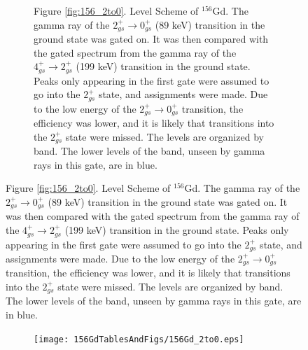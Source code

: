 \begin{figure}[!]
    \centering
    \label{fig:156_2to0}
    \begin{subfigure}{\textwidth}
    \caption*{\centering \fontsize{10pt}{12pt}Figure \ref{fig:156_2to0}. Level Scheme of $^{156}$Gd. The gamma ray of the $2^+_{gs}\rightarrow 0^+_{gs}$ (89 keV) transition in the ground state was gated on. It was then compared with the gated spectrum from the gamma ray of the $4^+_{gs}\rightarrow 2^+_{gs}$ (199 keV) transition in the ground state. Peaks only appearing in the first gate were assumed to go into the $2^+_{gs}$ state, and assignments were made. Due to the low energy of the $2^+_{gs}\rightarrow 0^+_{gs}$ transition, the efficiency was lower, and it is likely that transitions into the $2^+_{gs}$ state were missed. The levels are organized by band. The lower levels of the band, unseen by gamma rays in this gate, are in blue.}
    \end{subfigure}
\end{figure}
\clearpage
\begin{figure}
    \ContinuedFloat
    \begin{subfigure}{\textwidth}
    \texttt{[image: 156GdTablesAndFigs/156Gd\_2to0.eps]}
    \label{fig:156_2to0level}
    \end{subfigure}
\end{figure}
